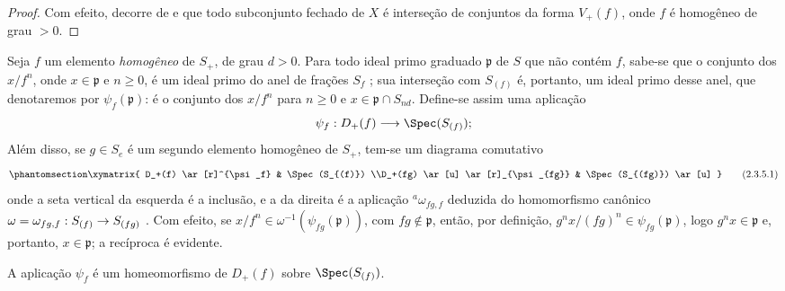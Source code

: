 \documentclass[oneside,10pt]{amsart}
\makeatletter
\renewcommand{\geq}{\geqslant}
\newcommand{\ega@arrow}[2]{\mathchoice{#1}{#2}{#2}{#2}}
\renewcommand{\to}{\ega@arrow{\longrightarrow}{\rightarrow}}
\let\EGAOriginalLabel\label
\renewcommand{\label}[1]{\phantomsection\EGAOriginalLabel{#1}}
\makeatother
\begin{document}
\begin{proof}
Com efeito, decorre de  e  que todo subconjunto fechado de $X$ é interseção de conjuntos da forma $V_+(f)$, onde $f$ é homogêneo de grau $>0$.
\end{proof}

\begin{env}[2.3.5]
\label{II.2.3.5}
Seja $f$ um elemento \emph{homogêneo} de $S_+$, de grau $d>0$.
Para todo ideal primo graduado $\mathfrak{p}$ de $S$ que não contém $f$, sabe-se que o conjunto dos $x/f^n$, onde $x\in\mathfrak{p}$ e $n\geq0$, é um ideal primo do anel de frações $S_f$ ; sua interseção com $S_{(f)}$ é, portanto, um ideal primo desse anel, que denotaremos por $\psi_f(\mathfrak{p})$: é o conjunto dos $x/f^n$ para $n\geq0$ e $x\in\mathfrak{p}\cap S_{nd}$.
Define-se assim uma aplicação
\[
  \psi_f:D_+(f)\to\Spec(S_{(f)});
\]
Além disso, se $g\in S_e$ é um segundo elemento homogêneo de $S_+$, tem-se um diagrama comutativo
\[
\label{II.2.3.5.1}
  \xymatrix{
    D_+(f) \ar[r]^{\psi_f}
    & \Spec(S_{(f)})
  \\D_+(fg) \ar[u] \ar[r]_{\psi_{fg}}
    & \Spec(S_{(fg)}) \ar[u]
  }
\tag{2.3.5.1}
\]
onde a seta vertical da esquerda é a inclusão, e a da direita é a aplicação ${}^a\!\omega_{fg,f}$ deduzida do homomorfismo canônico $\omega=\omega_{fg,f}:S_{(f)}\to S_{(fg)}$ .
Com efeito, se $x/f^n\in\omega^{-1}(\psi_{fg}(\mathfrak{p}))$, com $fg\notin\mathfrak{p}$, então, por definição, $g^nx/(fg)^n\in\psi_{fg}(\mathfrak{p})$, logo $g^nx\in\mathfrak{p}$ e, portanto, $x\in\mathfrak{p}$; a recíproca é evidente.
\end{env}

\begin{proposition}[2.3.6]
\label{II.2.3.6}
A aplicação $\psi_f$ é um homeomorfismo de $D_+(f)$ sobre $\Spec(S_{(f)})$.
\end{proposition}
\end{document}
